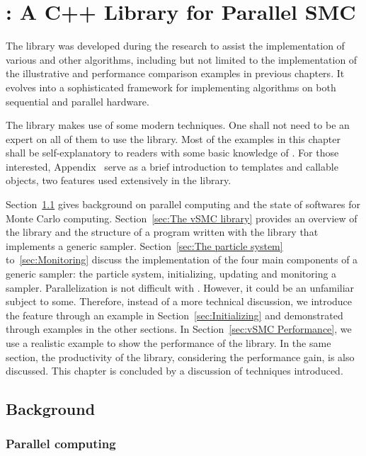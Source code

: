 \chapter[vSMC: A C++ Library for Parallel SMC]
{\protect\vsmc: A C++ Library for Parallel SMC}
\label{cha:vSMC: A C++ Library for Parallel SMC}

The \vsmc library was developed during the research to assist the
implementation of various \smc and other algorithms, including but not limited
to the implementation of the illustrative and performance comparison examples
in previous chapters. It evolves into a sophisticated \cpp framework for
implementing \smc algorithms on both sequential and parallel hardware.

The library makes use of some modern \cpp techniques. One shall not need to be
an expert on all of them to use the library. Most of the examples in this
chapter shall be self-explanatory to readers with some basic knowledge of
\cpp. For those interested, Appendix~ serve as a brief
introduction to \cpp templates and callable objects, two features used
extensively in the \vsmc library.

Section~\ref{sec:vSMC Background} gives background on parallel computing and
the state of softwares for Monte Carlo computing. Section~\ref{sec:The vSMC
  library} provides an overview of the library and the structure of a program
written with the library that implements a generic \smc sampler.
Section~\ref{sec:The particle system} to~\ref{sec:Monitoring} discuss the
implementation of the four main components of a generic \smc sampler: the
particle system, initializing, updating and monitoring a sampler.
Parallelization is not difficult with \vsmc. However, it could be an
unfamiliar subject to some. Therefore, instead of a more technical discussion,
we introduce the feature through an example in Section~\ref{sec:Initializing}
and demonstrated through examples in the other sections. In
Section~\ref{sec:vSMC Performance}, we use a realistic example to show the
performance of the library. In the same section, the productivity of the
library, considering the performance gain, is also discussed. This chapter is
concluded by a discussion of techniques introduced.

\section{Background}
\label{sec:vSMC Background}

\subsection{Parallel computing}
\label{sub:Parallel computing}

